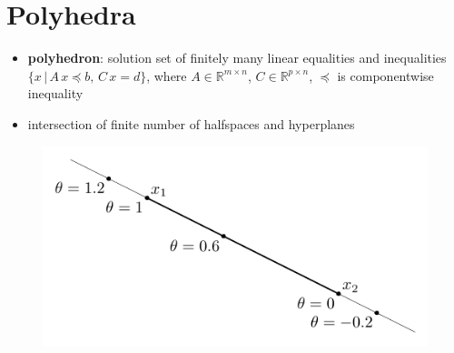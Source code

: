 \documentclass[11pt]{extarticle}
\newcommand{\ds}{\displaystyle}
\theoremstyle{definition}
\begin{document}
\section*{Polyhedra}
\begin{itemize}
  \item {\bf polyhedron}: solution set of finitely many linear equalities and inequalities $\ds\{x\,|\,A\,x\preccurlyeq b,\, C\,x = d\}$, where $\ds A\in\mathbb{R}^{m\times n}$, $\ds C\in\mathbb{R}^{p\times n}$, $\preccurlyeq$ is componentwise inequality
  \item intersection of finite number of halfspaces and hyperplanes
\end{itemize}
\vspace{-1em}
\begin{figure}[!htbp]
  \centering
  \includegraphics[scale=0.8,page=11]{fig/02.pdf}
\end{figure}

\newpage
\end{document}
